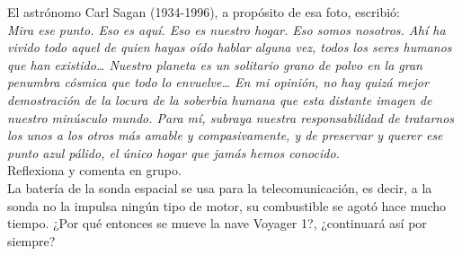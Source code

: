 \documentclass[11pt]{book}
\begin{document}
\begin{boxF}
  El astrónomo Carl Sagan (1934-1996), a propósito de esa foto, escribió:\\
  \emph{\small Mira ese punto. Eso es aquí. Eso es nuestro hogar. Eso somos nosotros.
    Ahí ha vivido todo aquel de quien hayas oído hablar alguna vez,
    todos los seres humanos que han existido\dots
    Nuestro planeta es un solitario grano de polvo en la gran penumbra
    cósmica que todo lo envuelve\dots
    En mi opinión, no hay quizá mejor demostración
    de la locura de la soberbia humana que esta distante imagen de nuestro minúsculo
    mundo. Para mí, subraya nuestra responsabilidad de tratarnos los unos a los
    otros más amable y compasivamente, y de preservar y querer ese punto azul pálido,
    el único hogar que jamás hemos conocido.}\\

  Reflexiona y comenta en grupo.\\

  La batería de la sonda espacial se usa para la telecomunicación, es decir, a la sonda no la impulsa ningún tipo de motor, su combustible se agotó hace mucho tiempo. ¿Por qué entonces se mueve la nave Voyager 1?, ¿continuará así por siempre?
\end{boxF}
\end{document}
